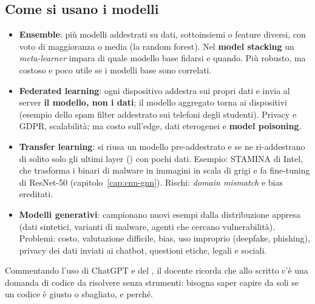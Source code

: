 \subsection{Come si usano i modelli}
\begin{itemize}
  \item \textbf{Ensemble}: più modelli addestrati su dati, sottoinsiemi o feature diversi, con voto di
    maggioranza o media (la random forest). Nel \textbf{model stacking} un \emph{meta-learner} impara
    di quale modello base fidarsi e quando. Più robusto, ma costoso e poco utile se i modelli base sono
    correlati.
  \item \textbf{Federated learning}: ogni dispositivo addestra sui propri dati e invia al server
    \textbf{il modello, non i dati}; il modello aggregato torna ai dispositivi (esempio dello spam
    filter addestrato sui telefoni degli studenti). Privacy e GDPR, scalabilità; ma costo sull'edge,
    dati eterogenei e \textbf{model poisoning}.
  \item \textbf{Transfer learning}: si riusa un modello pre-addestrato e se ne ri-addestrano di solito
    solo gli ultimi layer () con pochi dati. Esempio: STAMINA di Intel, che trasforma
    i binari di malware in immagini in scala di grigi e fa fine-tuning di ResNet-50
    (capitolo~\ref{cap:cnn-gnn}). Rischi: \emph{domain mismatch} e bias ereditati.
  \item \textbf{Modelli generativi}: campionano nuovi esempi dalla distribuzione appresa (dati
    sintetici, varianti di malware, agenti che cercano vulnerabilità). Problemi: costo, valutazione
    difficile, bias, uso improprio (deepfake, phishing), privacy dei dati inviati ai chatbot, questioni
    etiche, legali e sociali.
\end{itemize}

\begin{esame}
Commentando l'uso di ChatGPT e del , il docente ricorda che allo scritto c'è una
domanda di codice da risolvere senza strumenti: bisogna saper capire da soli se un codice è giusto o
sbagliato, e perché.
\end{esame}

